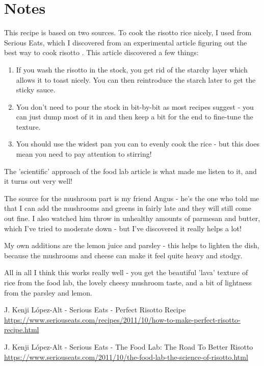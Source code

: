 \documentclass[10pt,a4paper]{article}
\begin{document}
	\section{Notes}
	
	This recipe is based on two sources. To cook the risotto rice nicely, I used \cite{perfris} from Serious Eats, which I discovered from an experimental article figuring out the best way to cook risotto \cite{foodlab}. This article discovered a few things: 
	\begin{enumerate}
		\item If you wash the risotto in the stock, you get rid of the starchy layer which allows it to toast nicely. You can then reintroduce the starch later to get the sticky sauce.
		\item You don't need to pour the stock in bit-by-bit as most recipes suggest - you can just dump most of it in and then keep a bit for the end to fine-tune the texture.
		\item You should use the widest pan you can to evenly cook the rice - but this does mean you need to pay attention to stirring!
	\end{enumerate}
	The 'scientific' approach of the food lab article is what made me listen to it, and it turns out very well!	


	The source for the mushroom part is my friend Angus - he's the one who told me that I can add the mushrooms and greens in fairly late and they will still come out fine. I also watched him throw in unhealthy amounts of parmesan and butter, which I've tried to moderate down - but I've discovered it really helps a lot!
	
	My own additions are the lemon juice and parsley - this helps to lighten the dish, because the mushrooms and cheese can make it feel quite heavy and stodgy.


	All in all I think this works really well - you get the beautiful 'lava' texture of rice from the food lab, the lovely cheesy mushroom taste, and a bit of lightness from the parsley and lemon.
	
	\begin{thebibliography}{5}
		 J. Kenji López-Alt - Serious Eats - Perfect Risotto Recipe \url{https://www.seriouseats.com/recipes/2011/10/how-to-make-perfect-risotto-recipe.html}
		
		  J. Kenji López-Alt - Serious Eats - The Food Lab: The Road To Better Risotto \url{https://www.seriouseats.com/2011/10/the-food-lab-the-science-of-risotto.html}
		
	\end{thebibliography}
\end{document}
